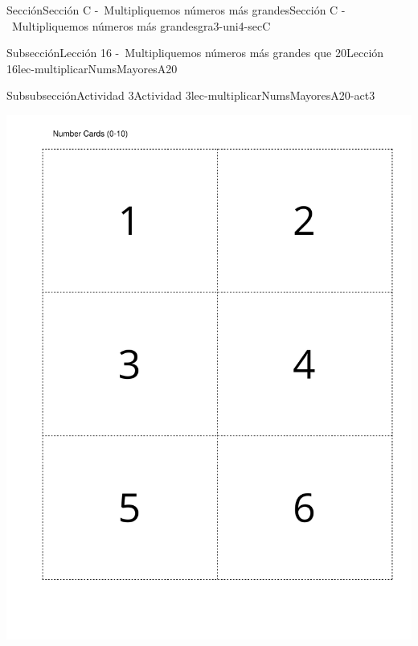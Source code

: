 \begin{sectionptx}{Sección}{Sección C -~Multipliquemos números más grandes}{}{Sección C -~Multipliquemos números más grandes}{}{}{gra3-uni4-secC}
\begin{subsectionptx}{Subsección}{Lección 16 -~Multipliquemos números más grandes que 20}{}{Lección 16}{}{}{lec-multiplicarNumsMayoresA20}
\begin{subsubsectionptx}{Subsubsección}{Actividad 3}{}{Actividad 3}{}{}{lec-multiplicarNumsMayoresA20-act3}
\begin{cutoutpage}
\begin{image}{0}{1}{0}{}
\includegraphics[page=1, rotate=90, scale=0.55, trim=40 40 20 40, clip, center] {external/blm/pdf-source/tarjetasDeDigitos.pdf}
\end{image}%
\begin{image}{0}{1}{0}{}%

\end{image}
\end{cutoutpage}
\end{subsubsectionptx}
\end{subsectionptx}
\end{sectionptx}
